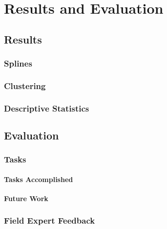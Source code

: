 \chapter{Results and Evaluation}

\section{Results}
\subsection{Splines}
\subsection{Clustering}
\subsection{Descriptive Statistics}

\section{Evaluation}
\subsection{Tasks}
\subsubsection{Tasks Accomplished}
\subsubsection{Future Work}
\subsection{Field Expert Feedback}
